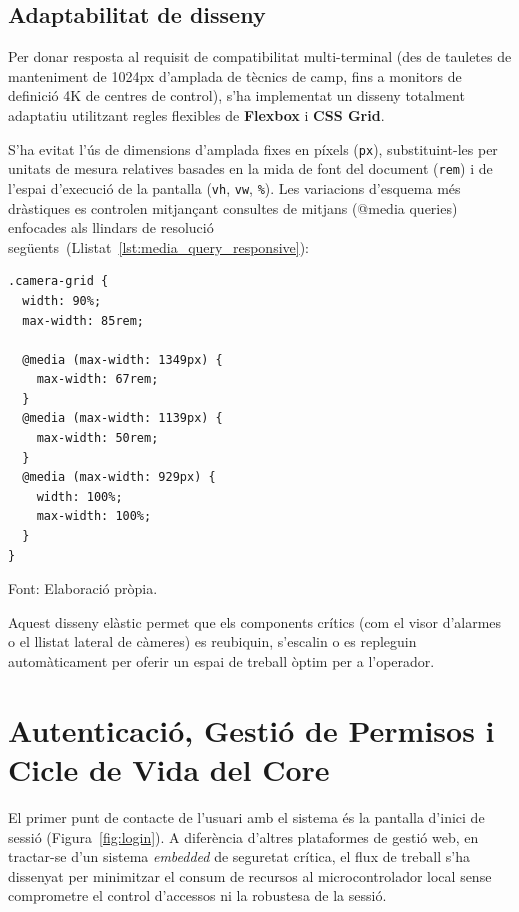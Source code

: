 \subsection{Adaptabilitat de disseny}
Per donar resposta al requisit de compatibilitat multi-terminal (des de tauletes de manteniment de 1024px d'amplada de tècnics de camp, fins a monitors de definició 4K de centres de control), s'ha implementat un disseny totalment adaptatiu utilitzant regles flexibles de \textbf{Flexbox} i \textbf{CSS Grid}.

S'ha evitat l'ús de dimensions d'amplada fixes en píxels (\texttt{px}), substituint-les per unitats de mesura relatives basades en la mida de font del document (\texttt{rem}) i de l'espai d'execució de la pantalla (\texttt{vh}, \texttt{vw}, \texttt{\%}). Les variacions d'esquema més dràstiques es controlen mitjançant consultes de mitjans (@media queries) enfocades als llindars de resolució següents~(Llistat~\ref{lst:media_query_responsive}):

\begin{lstlisting}[basicstyle=\footnotesize, label={lst:media_query_responsive}, caption={Exemple de Media Query responsiva per a la graella de mosaics del tauler principal.}]
.camera-grid {
  width: 90%;
  max-width: 85rem;

  @media (max-width: 1349px) {
    max-width: 67rem;
  }
  @media (max-width: 1139px) {
    max-width: 50rem;
  }
  @media (max-width: 929px) {
    width: 100%;
    max-width: 100%;
  }
}
\end{lstlisting}
\smallskip\par{\small\noindent Font: Elaboració pròpia.}
\medskip

Aquest disseny elàstic permet que els components crítics (com el visor d'alarmes o el llistat lateral de càmeres) es reubiquin, s'escalin o es repleguin automàticament per oferir un espai de treball òptim per a l'operador.

\section{Autenticació, Gestió de Permisos i Cicle de Vida del Core}
El primer punt de contacte de l'usuari amb el sistema és la pantalla d'inici de sessió (Figura~\ref{fig:login}). A diferència d'altres plataformes de gestió web, en tractar-se d'un sistema \textit{embedded} de seguretat crítica, el flux de treball s'ha dissenyat per minimitzar el consum de recursos al microcontrolador local sense comprometre el control d'accessos ni la robustesa de la sessió.

